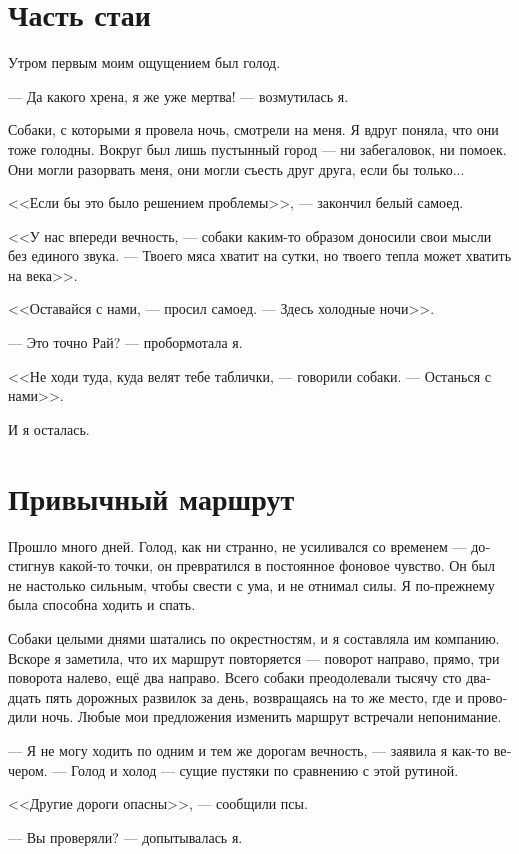 \documentclass[a4paper,12pt,fleqn]{book}\usepackage{polyglossia}\setdefaultlanguage[babelshorthands=true]{russian}\setotherlanguage{english}\defaultfontfeatures{Ligatures=TeX,Mapping=tex-text}\usepackage{xcolor}\newcommand{\ml}[3]{#2}
\begin{document}
\section{Часть стаи}

Утром первым моим ощущением был голод.

--- Да какого хрена, я же уже мертва! --- возмутилась я.

Собаки, с которыми я провела ночь, смотрели на меня.
Я вдруг поняла, что они тоже голодны.
Вокруг был лишь пустынный город --- ни забегаловок, ни помоек.
Они могли разорвать меня, они могли съесть друг друга, если бы только...

<<Если бы это было решением проблемы>>, --- закончил белый самоед.

<<У нас впереди вечность, --- собаки каким-то образом доносили свои мысли без единого звука.
--- Твоего мяса хватит на сутки, но твоего тепла может хватить на века>>.

<<Оставайся с нами, --- просил самоед.
--- Здесь холодные ночи>>.

--- Это точно Рай? --- пробормотала я.

<<Не ходи туда, куда велят тебе таблички, --- говорили собаки.
--- Останься с нами>>.

И я осталась.

\section{Привычный маршрут}

Прошло много дней.
Голод, как ни странно, не усиливался со временем --- достигнув какой-то точки, он превратился в постоянное фоновое чувство.
Он был не настолько сильным, чтобы свести с ума, и не отнимал силы.
Я по-прежнему была способна ходить и спать.

Собаки целыми днями шатались по окрестностям, и я составляла им компанию.
Вскоре я заметила, что их маршрут повторяется --- поворот направо, прямо, три поворота налево, ещё два направо.
Всего собаки преодолевали тысячу сто двадцать пять дорожных развилок за день, возвращаясь на то же место, где и проводили ночь.
Любые мои предложения изменить маршрут встречали непонимание.

--- Я не могу ходить по одним и тем же дорогам вечность, --- заявила я как-то вечером.
--- Голод и холод --- сущие пустяки по сравнению с этой рутиной.

<<Другие дороги опасны>>, --- сообщили псы.

--- Вы проверяли? --- допытывалась я.
\end{document}
